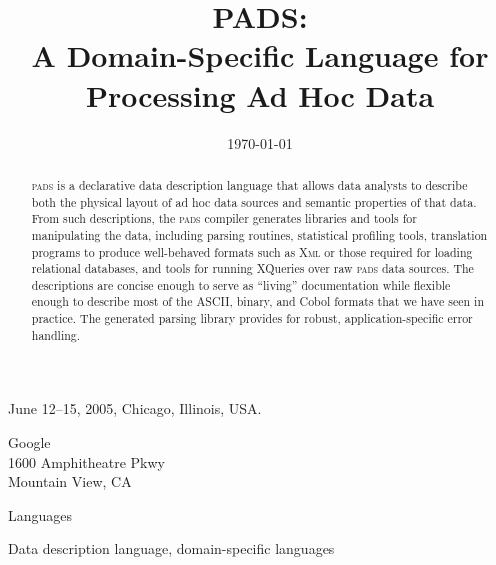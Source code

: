\documentclass{sigplanconf}
\newcommand{\pads}{\textsc{pads}}
\newcommand{\xml}{\textsc{Xml}}
\begin{document}
 {June 12--15, 2005, Chicago, Illinois, USA.}


\title{PADS:\\ A Domain-Specific Language for Processing Ad Hoc Data}

       {}

       {Google\\
       1600 Amphitheatre Pkwy\\
        Mountain View, CA}
       {}

\date{\today}


\maketitle
\begin{abstract}
\pads{} is a declarative data description language that allows data
analysts to describe both the physical layout of ad hoc data sources
and semantic properties of that data.  From such descriptions, the
\pads{} compiler generates libraries and tools for manipulating the
data, including parsing routines, statistical profiling tools,
translation programs to produce well-behaved
formats such as \xml{} or those required for loading relational
databases, and tools for running XQueries over raw \pads{} data sources.
The descriptions are concise enough to serve as ``living'' documentation
while flexible enough to describe most of the ASCII, binary, and
Cobol formats that we have seen in practice.  The generated parsing
library provides for robust, application-specific error handling.
\end{abstract}


\terms
Languages

\keywords
Data description language, domain-specific languages
\end{document}

